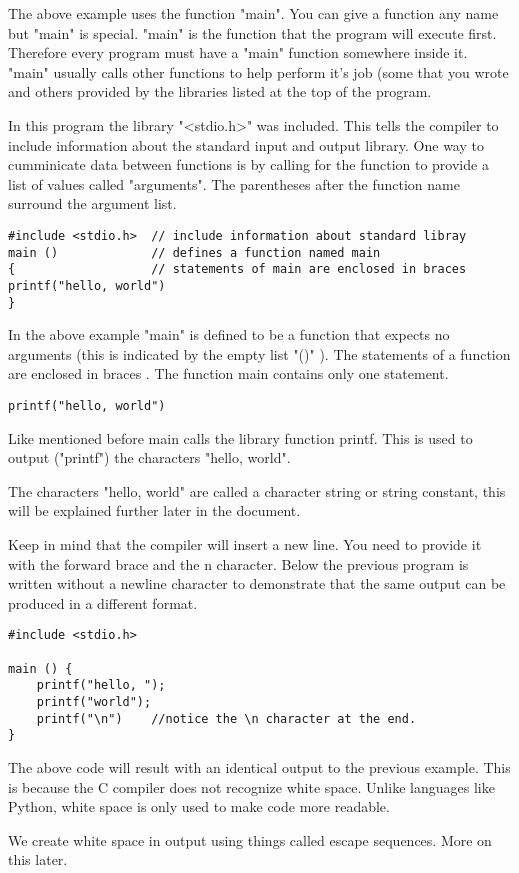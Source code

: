 \documentclass[a4paper]{article}
\begin{document}
The above example uses the function "main". You can give a function any name but "main" is special. "main" is the function that the program will execute first. Therefore every program must have a "main" function somewhere inside it. "main" usually calls other functions to help perform it's job (some that you wrote and others provided by the libraries listed at the top of the program.
\par \vspace{0.25cm}
In this program the library "<stdio.h>" was included. This tells the compiler to include information about the standard input and output library. One way to cumminicate data between functions is by calling for the function to provide a list of values called "arguments". The parentheses after the function name surround the argument list.
\begin{lstlisting}
#include <stdio.h>  // include information about standard libray
main ()             // defines a function named main
{                   // statements of main are enclosed in braces
printf("hello, world")
}
\end{lstlisting}
In the above example "main" is defined to be a function that expects no arguments (this is indicated by the empty list "()" ). The statements of a function are enclosed in braces {}. The function main contains only one statement.
\begin{lstlisting}
printf("hello, world")
\end{lstlisting}
Like mentioned before main calls the library function printf. This is used to output ("printf") the characters "hello, world".\par \vspace{0.25cm}
The characters "hello, world" are called a character string or string constant, this will be explained further later in the document.
\par \vspace{0.25cm}
Keep in mind that the compiler will insert a new line. You need to provide it with the forward brace and the n character. Below the previous program is written without a newline character to demonstrate that the same output can be produced in a different format.
\begin{lstlisting}
#include <stdio.h>

main () {
    printf("hello, ");
    printf("world");
    printf("\n")    //notice the \n character at the end.
}
\end{lstlisting}
The above code will result with an identical output to the previous example. This is because the C compiler does not recognize white space. Unlike languages like Python, white space is only used to make code more readable.
\par \vspace{0.25cm}
We create white space in output using things called escape sequences. More on this later.
\end{document}
